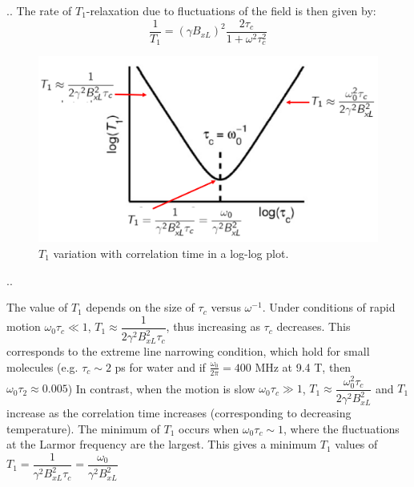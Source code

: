 \documentclass[handout]{beamer}
\begin{document}
\begin{frame}{\thesection.\thesubsection. \insertsubsection}
	The rate of $T_1$-relaxation due to fluctuations of the field is then given by:
	\begin{equation}
		\dfrac{1}{T_1} = (\gamma B_{xL})^2 \dfrac{2 \tau_c}{1 + \omega^2 \tau_c^2}
	\end{equation}
	  \begin{figure}\label{fig:T1_vs_tc}
	  	\centering
	  	\includegraphics[scale=0.4]{figures/T1_vs_tc.png}
	  	\caption{$T_1$ variation with correlation time in a log-log plot. }
	  \end{figure}
  
\end{frame}
\begin{frame}{\thesection.\thesubsection. \insertsubsection}
	  
	  The value of $T_1$ depends on the size of $\tau_c$ versus $\omega^{-1}$. Under conditions of rapid motion $ \omega_0 \tau_c \ll 1$, $T_1 \approx \dfrac{1}{2 \gamma^2 B_{xL}^2 \tau_c}$, thus increasing as $\tau_c$ decreases. This corresponds to the \alert{extreme line narrowing condition}, which hold for small molecules (e.g. $\tau_c \sim 2$ ps for water and if $\frac{\omega_0}{2 \pi}  = 400$ MHz at 9.4 T, then $\omega_0 \tau_2 \approx 0.005$)
	  In contrast, when the motion is slow $\omega_0 \tau_c \gg 1$, $T_1 \approx \dfrac{\omega_0^2 \tau_c}{2 \gamma^2 B_{xL}^2}$ and $T_1$ increase as the correlation time increases (corresponding to decreasing temperature).
	  The minimum of $T_1$ occurs when $\omega_0 \tau_c \sim 1$, where the fluctuations at the Larmor frequency are the largest. This gives a minimum $T_1$ values of $T_1= \dfrac{1}{\gamma^2 B_{xL}^2 \tau_c} = \dfrac{\omega_0}{\gamma^2 B_{xL}^2}$

\end{frame}
\end{document}
